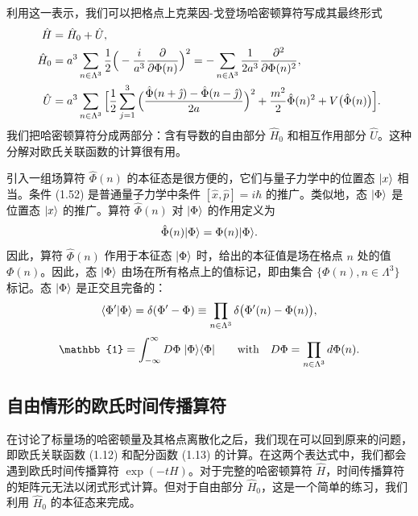 利用这一表示，我们可以把格点上克莱因-戈登场哈密顿算符写成其最终形式
\begin{align}
  \hat{H} &= \hat{H}_0 + \hat{U}, \notag\\
  \hat{H}_0 &= a^3\sum_{n\in\Lambda^3}\frac{1}{2}
    \Big(-\frac{i}{a^3}\frac{\partial}{\partial\Phi(n)}\Big)^2
    = -\sum_{n\in\Lambda^3}\frac{1}{2a^3}\frac{\partial^2}{\partial\Phi(n)^2}, \notag\\
  \hat{U} &= a^3\sum_{n\in\Lambda^3}\Big[
    \frac{1}{2}\sum_{j=1}^3
      \Big(\frac{\hat{\Phi}(n+\hat{\jmath}) - \hat{\Phi}(n-\hat{\jmath})}{2a}\Big)^2
    + \frac{m^2}{2}\hat{\Phi}(n)^2 + V\big(\hat{\Phi}(n)\big)\Big].
\end{align}
我们把哈密顿算符分成两部分：含有导数的自由部分 $\hat{H}_0$ 和相互作用部分 $\hat{U}$。这种分解对欧氏关联函数的计算很有用。

引入一组场算符 $\hat{\Phi}(n)$ 的本征态是很方便的，它们与量子力学中的位置态 $|x\rangle$ 相当。条件 (1.52) 是普通量子力学中条件 $[\hat{x}, \hat{p}] = i\hbar$ 的推广。类似地，态 $|\Phi\rangle$ 是位置态 $|x\rangle$ 的推广。算符 $\hat{\Phi}(n)$ 对 $|\Phi\rangle$ 的作用定义为
\begin{equation}
  \hat{\Phi}(n)|\Phi\rangle = \Phi(n)|\Phi\rangle.
\end{equation}
因此，算符 $\hat{\Phi}(n)$ 作用于本征态 $|\Phi\rangle$ 时，给出的本征值是场在格点 $n$ 处的值 $\Phi(n)$。因此，态 $|\Phi\rangle$ 由场在所有格点上的值标记，即由集合 $\{\Phi(n), n \in \Lambda^3\}$ 标记。态 $|\Phi\rangle$ 是正交且完备的：
\begin{equation}
  \langle\Phi'|\Phi\rangle = \delta(\Phi' - \Phi)
  \equiv \prod_{n\in\Lambda^3}\delta\big(\Phi'(n) - \Phi(n)\big),
\end{equation}
\begin{equation}
  \mathbb{1} = \int_{-\infty}^{\infty}D\Phi\;\ket{\Phi}\bra{\Phi}
  \qquad \text{with} \quad D\Phi = \prod_{n\in\Lambda^3}d\Phi(n).
\end{equation}

\subsection{自由情形的欧氏时间传播算符}

在讨论了标量场的哈密顿量及其格点离散化之后，我们现在可以回到原来的问题，即欧氏关联函数 (1.12) 和配分函数 (1.13) 的计算。在这两个表达式中，我们都会遇到欧氏时间传播算符 $\exp(-tH)$。对于完整的哈密顿算符 $\hat{H}$，时间传播算符的矩阵元无法以闭式形式计算。但对于自由部分 $\hat{H}_0$，这是一个简单的练习，我们利用 $\hat{H}_0$ 的本征态来完成。

